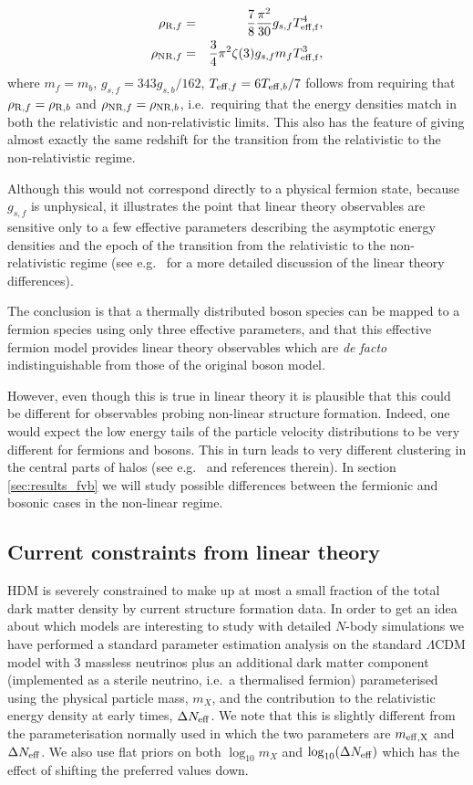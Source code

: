 \documentclass[11pt,a4paper]{article}
\renewcommand\({\left(}
\renewcommand\){\right)}
\renewcommand\[{\left[}
\renewcommand\]{\right]}
\begin{document}
\begin{eqnarray}
\rho_{{\rm R},f} & = & \frac{7}{8} \frac{\pi^2}{30} g_{s,f} T_{\rm eff,f}^4, \\
\rho_{{\rm NR},f} & = & \frac{3}{4} \pi^2 \zeta(3) g_{s,f} m_{f} T_{\rm eff,f}^3, 
\end{eqnarray}
where $m_f = m_b$, $g_{s,f} = 343 g_{s,b}/162$, $T_{{\rm eff},f} = 6 T_{{\rm eff},b}/7$ follows from requiring that $\rho_{{\rm R},f} = \rho_{{\rm R},b}$ and $\rho_{{\rm NR},f} = \rho_{{\rm NR},b}$, i.e.\ requiring that the energy densities match in both the relativistic and non-relativistic limits. This also has the feature of giving almost exactly the same redshift for the transition from the relativistic to the non-relativistic regime.

Although this would not correspond directly to a physical fermion state, because $g_{s,f}$ is unphysical, it illustrates the point that linear theory observables are sensitive only to a few effective parameters describing the asymptotic energy densities and the epoch of the transition from the relativistic to the non-relativistic regime (see e.g.\ \cite{Hannestad:2005bt} for a more detailed discussion of the linear theory differences).

The conclusion is that a thermally distributed boson species can be mapped to a fermion species using only three effective parameters, and that this effective fermion model provides linear theory observables which are {\it de facto} indistinguishable from those of the original boson model.

However, even though this is true in linear theory it is plausible that this could be different for observables probing non-linear structure formation. Indeed, one would expect the low energy tails of the particle velocity distributions to be very different for fermions and bosons. This in turn leads to very different clustering in the central parts of halos (see e.g.\ \cite{Hannestad:2005bt} and references therein). 
In section \ref{sec:results_fvb} we will study possible differences between the fermionic and bosonic cases in the non-linear regime.

\subsection{Current constraints from linear theory}
HDM is severely constrained to make up at most a small fraction of the total dark matter density by current structure formation data.
In order to get an idea about which models are interesting to study with detailed $N$-body simulations we have performed a standard parameter estimation analysis on the standard $\Lambda$CDM model with 3 massless neutrinos plus an additional dark matter component (implemented as a sterile neutrino, i.e.\ a thermalised fermion) parameterised using the physical particle mass, $m_X$, and the contribution to the relativistic energy density at early times, $\Delta N_{\rm eff}$. 
We note that this is slightly different from the parameterisation normally used in which the two parameters are $m_{\rm eff,X}$ and $\Delta N_{\rm eff}$. We also use flat priors on both $\log_{10}m_X$ and $\log_{10}(\Delta N_{\rm eff})$ which has the effect of shifting the preferred values down.
\end{document}
